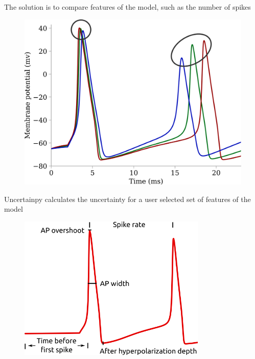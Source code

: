 \documentclass[presentation]{beamer}
\begin{document}


\begin{frame}{The solution is to compare features of the model,
  such as the number of spikes}
  \vspace{-5mm}
  \begin{figure}
    \includegraphics[height=0.8\textheight]{features_why_3.png}
  \end{figure}
  \end{frame}








\begin{frame}{Uncertainpy calculates the uncertainty for a user selected set of
              features of the model}
  \vspace{-5mm}
  \begin{figure}
      \includegraphics[width=0.8\textwidth]{features.png}
  \end{figure}
  \end{frame}
\end{document}
